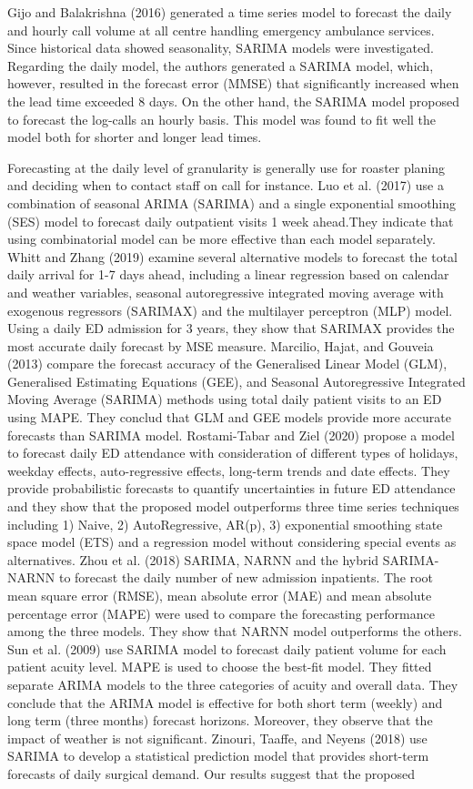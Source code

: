 \documentclass[]{elsarticle} %
\begin{document}
Gijo and Balakrishna (2016) generated a time series model to forecast the daily and hourly call volume at all centre handling emergency ambulance services. Since historical data showed seasonality, SARIMA models were investigated. Regarding the daily model, the authors generated a SARIMA model, which, however, resulted in the forecast error (MMSE) that significantly increased when the lead time exceeded 8 days. On the other hand, the SARIMA model proposed to forecast the log-calls an hourly basis. This model was found to fit well the model both for shorter and longer lead times.

Forecasting at the daily level of granularity is generally use for roaster planing and deciding when to contact staff on call for instance. Luo et al. (2017) use a combination of seasonal ARIMA (SARIMA) and a single exponential smoothing (SES) model to forecast daily outpatient visits 1 week ahead.They indicate that using combinatorial model can be more effective than each model separately. Whitt and Zhang (2019) examine several alternative models to forecast the total daily arrival for 1-7 days ahead, including a linear regression based on calendar and weather variables, seasonal autoregressive integrated moving average with exogenous regressors (SARIMAX) and the multilayer perceptron (MLP) model. Using a daily ED admission for 3 years, they show that SARIMAX provides the most accurate daily forecast by MSE measure. Marcilio, Hajat, and Gouveia (2013) compare the forecast accuracy of the Generalised Linear Model (GLM), Generalised Estimating Equations (GEE), and Seasonal Autoregressive Integrated Moving Average (SARIMA) methods using total daily patient visits to an ED using MAPE. They conclud that GLM and GEE models provide more accurate forecasts than SARIMA model. Rostami-Tabar and Ziel (2020) propose a model to forecast daily ED attendance with consideration of different types of holidays, weekday effects, auto-regressive effects, long-term trends and date effects. They provide probabilistic forecasts to quantify uncertainties in future ED attendance and they show that the proposed model outperforms three time series techniques including 1) Naive, 2) AutoRegressive, AR(p), 3) exponential smoothing state space model (ETS) and a regression model without considering special events as alternatives. Zhou et al. (2018) SARIMA, NARNN and the hybrid SARIMA-NARNN to forecast the daily number of new admission inpatients. The root mean square error (RMSE), mean absolute error (MAE) and mean absolute percentage error (MAPE) were used to compare the forecasting performance among the three models. They show that NARNN model outperforms the others. Sun et al. (2009) use SARIMA model to forecast daily patient volume for each patient acuity level. MAPE is used to choose the best-fit model. They fitted separate ARIMA models to the three categories of acuity and overall data. They conclude that the ARIMA model is effective for both short term (weekly) and long term (three months) forecast horizons. Moreover, they observe that the impact of weather is not significant. Zinouri, Taaffe, and Neyens (2018) use SARIMA to develop a statistical prediction model that provides short-term forecasts of daily surgical demand. Our results suggest that the proposed 
\end{document}
